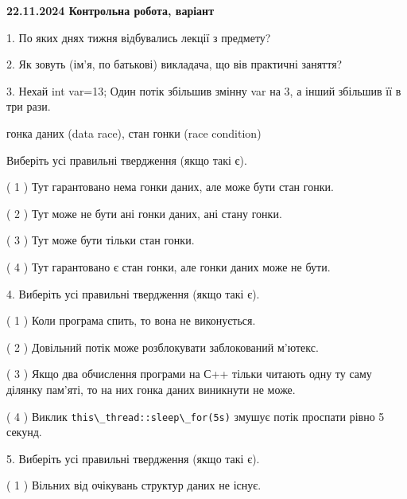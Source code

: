 \documentclass[12pt, ukrainian]{article}
\def\code#1{\Verb!#1!}
\begin{document}
\vspace{4mm}
\newpage
\begin {large}

\textbf{22.11.2024 Контрольна робота, варіант  }\par


{
1. По яких днях тижня відбувались лекції з предмету?



\vspace{5mm}
2. Як зовуть (ім'я, по батькові) викладача, що вів практичні заняття?



\vspace{5mm}
3. Нехай int var=13; Один потік збільшив змінну var на 3, а інший збільшив її в три рази.

гонка даних (data race), стан гонки (race condition)

Виберіть усі правильні твердження (якщо такі є).\par
\vspace{2mm}
( 1 ) Тут гарантовано нема гонки даних, але може бути стан гонки.%

( 2 ) Тут може не бути ані гонки даних, ані стану гонки.%

( 3 ) Тут може бути тільки стан гонки.%

( 4 ) Тут гарантовано є стан гонки, але гонки даних може не бути.%


\vspace{5mm}
4. Виберіть усі правильні твердження (якщо такі є).\par
\vspace{2mm}

( 1 ) Коли програма спить, то вона не виконується.%

( 2 ) Довільний потік може розблокувати заблокований м’ютекс.%

( 3 ) Якщо два обчислення програми на С++ тільки читають одну ту саму ділянку пам'яті, то на них гонка даних  виникнути не може.%

( 4 ) Виклик \code{this\_thread::sleep\_for(5s)} змушує потік проспати рівно 5 секунд.%


\vspace{5mm}
5. Виберіть усі правильні твердження (якщо такі є).\par
\vspace{2mm}

( 1 ) Вільних від очікувань структур даних не існує.%

}
\end{large}
\end{document}
